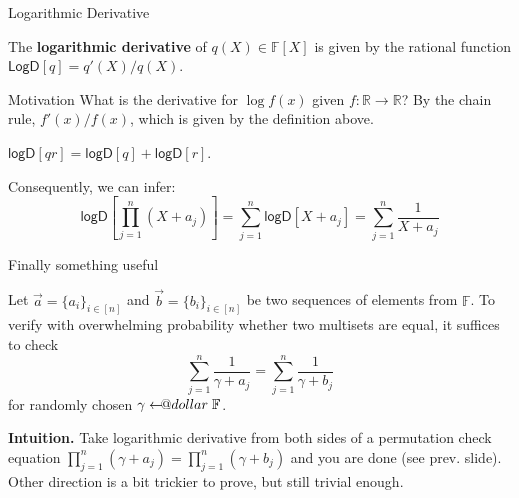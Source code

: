 \documentclass{zkdl-presentation-template}
\makeatletter
\newcommand\leftarrowS{\leftarrow\joinrel\smalldollar}
\newcommand{\smalldollar}{\mathrel{\mathpalette\small@dollar\relax}}
\newcommand{\small@dollar}[2]{%
  \vcenter{\hbox{%
    $#1\textnormal{\fontsize{0.7\dimexpr\f@size pt}{0}\selectfont\$}$%
  }}%
}
\makeatother
\begin{document}
    \begin{frame}{Logarithmic Derivative}
        \begin{definition}
            The \textbf{logarithmic derivative} of $q(X) \in \mathbb{F}[X]$ is given by the 
            rational function $\mathsf{LogD}[q] = q'(X)/q(X)$.
        \end{definition}
        \begin{alertblock}{Motivation}
            What is the derivative for $\log f(x)$ given $f: \mathbb{R} \to
            \mathbb{R}$? \hspace{1px} By the chain rule, $f'(x)/f(x)$, which is given by
            the definition above.
        \end{alertblock}

        \begin{lemma}
            $\mathsf{logD}[qr]=\mathsf{logD}[q] + \mathsf{logD}[r]$.
        \end{lemma}

        Consequently, we can infer:
        \begin{equation*}
            \mathsf{logD}\left[\prod_{j=1}^n (X+a_j)\right] = \sum_{j=1}^n \mathsf{logD}\left[X+a_j\right] = \sum_{j=1}^n \frac{1}{X+a_j}
        \end{equation*}
    \end{frame}

    \begin{frame}{Finally something useful}
        \begin{theorem}
            Let $\vec{a} = \{a_i\}_{i \in [n]}$ and $\vec{b} = \{b_i\}_{i \in [n]}$ be
            two sequences of elements from $\mathbb{F}$. To verify with overwhelming
            probability whether two multisets are equal, it suffices to check
            \begin{equation*}
                \sum_{j=1}^n \frac{1}{\gamma + a_j} = \sum_{j=1}^n \frac{1}{\gamma+b_j}
            \end{equation*}
            for randomly chosen $\gamma \leftarrowS \mathbb{F}$.
        \end{theorem}

        \textbf{Intuition.} Take logarithmic derivative from both sides of a
        permutation check equation $\prod_{j=1}^n (\gamma+a_j) = \prod_{j=1}^n
        (\gamma+b_j)$ and you are done (see prev. slide). Other direction is a
        bit trickier to prove, but still trivial enough.
    \end{frame}
\end{document}
